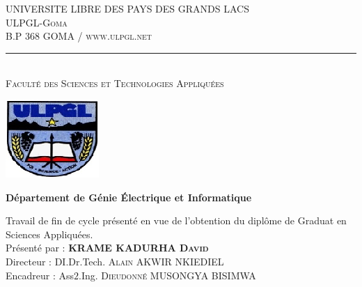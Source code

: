 \begin{center}
\textsc{\LARGE UNIVERSITE LIBRE DES PAYS DES GRANDS LACS}\\[0.4cm]
\textsc{\LARGE ULPGL-Goma}\\[0.4cm]
\textsc{\Large B.P $ 368 $ GOMA / www.ulpgl.net}\\
\vspace{2pt}
\rule{0.5\linewidth}{2pt}
\vspace{0.5cm}\\
\textsc{\Large Faculté des Sciences et Technologies Appliquées}\\
\begin{center}
\includegraphics[scale=1]{logoUL.png}
\end{center}
\textbf{\Large Département de Génie Électrique et Informatique}\\
\vspace{10pt}
\begin{center}
\end{center}
\vspace{35pt}
\hspace*{5cm}\begin{minipage}{0.7 \textwidth}
\begin{flushleft}\large
Travail de fin de cycle présenté en vue de l'obtention du diplôme de Graduat en Sciences Appliquées.\\
\vspace{7pt}
Présenté par : \textbf{\textsc{KRAME KADURHA David}}\\
Directeur : DI.Dr.Tech. \textsc{Alain AKWIR NKIEDIEL}\\
Encadreur : Ass$ 2 $.Ing. \textsc{Dieudonné MUSONGYA BISIMWA}
\end{flushleft}
\end{minipage}
\hrulefill
\begin{center}
\vspace{35pt}
\end{center}
\end{center}

